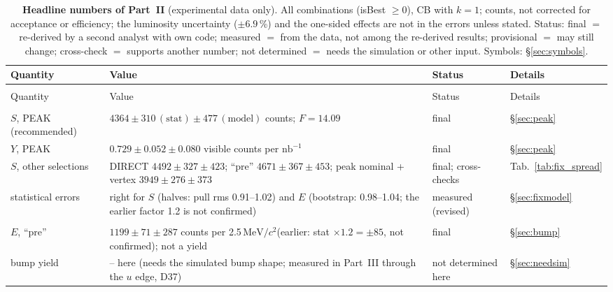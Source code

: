 \documentclass[11pt,a4paper]{article}
\renewcommand{\arraystretch}{1.15}
\newcommand{\nbinv}{\ensuremath{\mathrm{nb}^{-1}}\xspace}
\newcommand{\MeVcc}{\ensuremath{\mathrm{MeV}/c^{2}}\xspace}
\begin{document}
{\footnotesize
\setlength{\tabcolsep}{3pt}
\renewcommand{\arraystretch}{1.08}
\begin{longtable}{@{}>{\raggedright\arraybackslash}p{3.5cm} >{\raggedright\arraybackslash}p{\dimexpr\textwidth-6.85cm-6\tabcolsep\relax} >{\raggedright\arraybackslash}p{2.2cm} >{\raggedright\arraybackslash}p{1.15cm}@{}}
\caption{\textbf{Headline numbers of Part~II} (experimental data only). All combinations (isBest $\ge0$), CB with $k=1$; counts, not
corrected for acceptance or efficiency; the luminosity uncertainty ($\pm6.9$\,\%) and the one-sided effects are not in the errors
unless stated. Status: final $=$ re-derived by a second analyst with own code; measured $=$ from the data, not among the re-derived
results; provisional $=$ may still change; cross-check $=$
supports another number; not determined $=$ needs the simulation or other input. Symbols: \S\ref{sec:symbols}.}\label{tab:headline}\\
\toprule
Quantity & Value & Status & Details \\
\midrule
\endfirsthead
\multicolumn{4}{@{}l}{\emph{Table~\ref{tab:headline}, continued}} \\
\toprule
Quantity & Value & Status & Details \\
\midrule
\endhead
\bottomrule
\endfoot
\multicolumn{4}{@{}l}{\textbf{$\eta$ peak}} \\
$S$, PEAK (recommended) & $4364\pm310\,(\mathrm{stat})\pm477\,(\mathrm{model})$ counts; $F=14.09$ & final & \S\ref{sec:peak} \\
$Y$, PEAK & $0.729\pm0.052\pm0.080$ visible counts per \nbinv & final & \S\ref{sec:peak} \\
$S$, other selections & DIRECT $4492\pm327\pm423$; ``pre'' $4671\pm367\pm453$; peak nominal + vertex $3949\pm276\pm373$ & final; cross-checks & Tab.~\ref{tab:fix_spread} \\
statistical errors & right for $S$ (halves: pull rms 0.91--1.02) and $E$ (bootstrap: 0.98--1.04; the earlier factor 1.2 is not confirmed) & measured (revised) & \S\ref{sec:fixmodel} \\
\multicolumn{4}{@{}l}{\textbf{Bump and tagged $\eta$}} \\
$E$, ``pre'' & $1199\pm71\pm287$ counts per 2.5\,\MeVcc (earlier: stat $\times1.2=\pm85$, not confirmed); not a yield & final & \S\ref{sec:bump} \\
bump yield & -- here (needs the simulated bump shape; measured in Part~III through the $u$ edge, D37) & not determined here & \S\ref{sec:needsim} \\

\end{longtable}}
\end{document}
